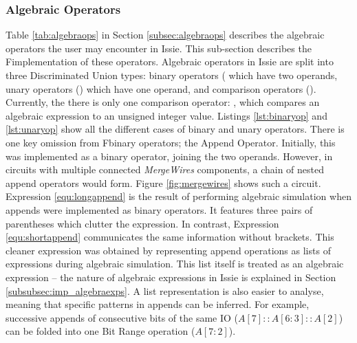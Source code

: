 \subsubsection{Algebraic Operators} \label{subsubsec:imp_algebraops}
Table \ref{tab:algebraops} in Section \ref{subsec:algebraops} describes the algebraic operators the user may encounter in Issie. This sub-section describes the F\fsharp implementation of these operators. Algebraic operators in Issie are split into three Discriminated Union types: binary operators ( which have two operands, unary operators () which have one operand, and comparison operators (). Currently, the there is only one comparison operator: , which compares an algebraic expression to an unsigned integer value. Listings \ref{lst:binaryop} and \ref{lst:unaryop} show all the different cases of binary and unary operators. There is one key omission from F\fsharp binary operators; the Append Operator. Initially, this was implemented as a binary operator, joining the two operands. However, in circuits with multiple connected \textit{MergeWires} components, a chain of nested append operators would form. Figure \ref{fig:mergewires} shows such a circuit. Expression \ref{equ:longappend} is the result of performing algebraic simulation when appends were implemented as binary operators. It features three pairs of parentheses which clutter the expression. In contrast, Expression \ref{equ:shortappend} communicates the same information without brackets. This cleaner expression was obtained by representing append operations as lists of expressions during algebraic simulation. This list itself is treated as an algebraic expression -- the nature of algebraic expressions in Issie is explained in Section \ref{subsubsec:imp_algebraexps}. A list representation is also easier to analyse, meaning that specific patterns in appends can be inferred. For example, successive appends of consecutive bits of the same IO ($A[7]::A[6:3]::A[2]$) can be folded into one Bit Range operation ($A[7:2]$). 
